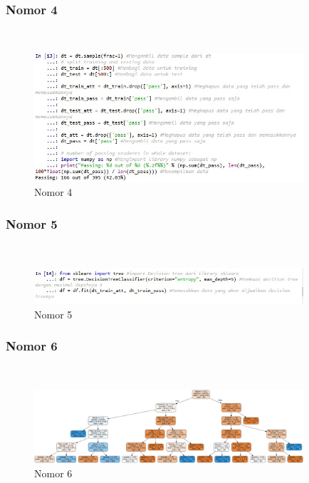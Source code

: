 \subsubsection{Nomor 4}
\hfill\\

\begin{figure}[H]
\centerline{\includegraphics[width=10cm]{figures/1174057/chapter2/14.jpg}}
\caption{Nomor 4}
\label{labelgambar}
\end{figure}

\subsubsection{Nomor 5}
\hfill\\

\begin{figure}[H]
\centerline{\includegraphics[width=10cm]{figures/1174057/chapter2/15.jpg}}
\caption{Nomor 5}
\label{labelgambar}
\end{figure}

\subsubsection{Nomor 6}
\hfill\\

\begin{figure}[H]
\centerline{\includegraphics[width=10cm]{figures/1174057/chapter2/16.png}}
\caption{Nomor 6}
\label{labelgambar}
\end{figure}

